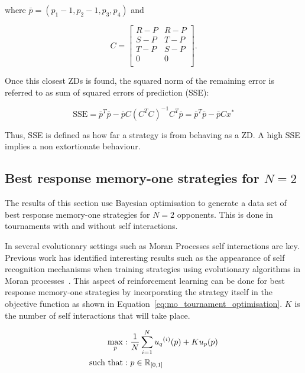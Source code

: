 where \(\bar{p}=(p_1 - 1, p_2 - 1, p_3, p_4)\) and

\begin{equation}\label{eq:definition_of_C}
    C =
    \begin{bmatrix}
        R - P & R- P \\
        S - P & T- P \\
        T - P & S- P \\
        0     & 0 \\
    \end{bmatrix}.
\end{equation}

Once this closest ZDs is found, the squared norm of the remaining error is
referred to as sum of squared errors of prediction (SSE):

\begin{equation}\label{eqn:x_SSError_formula}
    \text{SSE} = {\bar{p}} ^ T \bar{p} -
           \bar{p} C \left(C ^ T C \right) ^ {-1} C ^ T \bar{p}
         = {\bar{p}} ^ T \bar{p} - \bar{p} C x ^ *
\end{equation}

Thus, SSE is defined as how far a strategy is from behaving as a ZD. A
high SSE implies a non extortionate behaviour.

\subsection{Best response memory-one strategies for \(N=2\)}\label{subsection:best_response_n_2}

The results of this section use Bayesian optimisation to generate a data set of
best response memory-one strategies for \(N=2\) opponents. This is done in
tournaments with and without self interactions.

In several evolutionary settings such as Moran Processes self interactions are
key. Previous work has identified interesting results such as the appearance of
self recognition mechanisms when training strategies using evolutionary
algorithms in Moran processes~\cite{Knight2018}. This aspect of reinforcement
learning can be done for best response memory-one strategies by incorporating
the strategy itself in the objective function as shown in
Equation~\ref{eq:mo_tournament_optimisation}. \(K\) is the number of self
interactions that will take place.

\begin{equation}\label{eq:mo_evolutionary_optimisation}
    \begin{aligned}
    \max_p: & \ \frac{1}{N} \sum\limits_{i=1} ^ {N} {u_q}^{(i)} (p) + Ku_p(p)
    \\
    \text{such that}: & \ p \in \mathbb{R}_{[0, 1]}
    \end{aligned}
   \end{equation}

